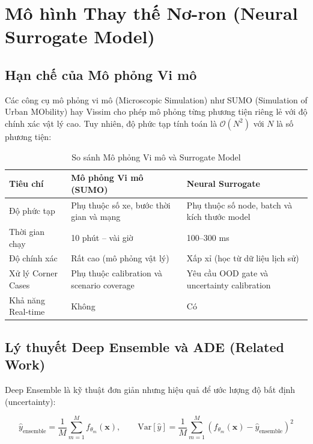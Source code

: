 \section{Mô hình Thay thế Nơ-ron (Neural Surrogate Model)}

\subsection{Hạn chế của Mô phỏng Vi mô}

Các công cụ mô phỏng vi mô (Microscopic Simulation) như SUMO (Simulation of Urban MObility) hay Vissim cho phép mô phỏng từng phương tiện riêng lẻ với độ chính xác vật lý cao. Tuy nhiên, độ phức tạp tính toán là $\mathcal{O}(N^2)$ với $N$ là số phương tiện:

\begin{table}[H]
\centering
\caption{So sánh Mô phỏng Vi mô và Surrogate Model}
\label{tab:sim_comparison}
\renewcommand{\arraystretch}{1.4}
\begin{tabular}{l p{4cm} p{4cm}}
\toprule
\textbf{Tiêu chí} & \textbf{Mô phỏng Vi mô (SUMO)} & \textbf{Neural Surrogate} \\
\midrule
Độ phức tạp & Phụ thuộc số xe, bước thời gian và mạng & Phụ thuộc số node, batch và kích thước model \\
\rowcolor{rowgray}
Thời gian chạy & 10 phút -- vài giờ & 100--300 ms \\
Độ chính xác & Rất cao (mô phỏng vật lý) & Xấp xỉ (học từ dữ liệu lịch sử) \\
\rowcolor{rowgray}
Xử lý Corner Cases & Phụ thuộc calibration và scenario coverage & Yêu cầu OOD gate và uncertainty calibration \\
Khả năng Real-time & Không & Có \\
\bottomrule
\end{tabular}
\end{table}

\subsection{Lý thuyết Deep Ensemble và ADE (Related Work)}

Deep Ensemble \cite{lakshminarayanan2017ade} là kỹ thuật đơn giản nhưng hiệu quả để ước lượng độ bất định (uncertainty):

\begin{equation}
  \hat{y}_{\text{ensemble}} = \frac{1}{M}\sum_{m=1}^{M} f_{\theta_m}(\mathbf{x}), \qquad
  \text{Var}[\hat{y}] = \frac{1}{M}\sum_{m=1}^{M}\left(f_{\theta_m}(\mathbf{x}) - \hat{y}_{\text{ensemble}}\right)^2
  \label{eq:ensemble}
\end{equation}

